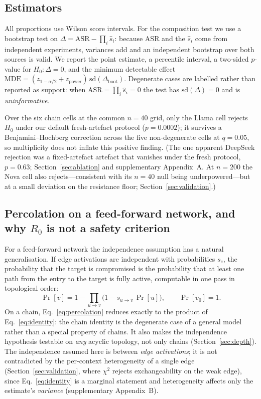 \documentclass[sigconf,anonymous]{aamas}
\begin{document}
\subsection{Estimators}

All proportions use Wilson score intervals. For the composition test we use a
bootstrap test on $\Delta = \mathrm{ASR} - \prod_i \hat s_i$: because ASR and the
$\hat s_i$ come from independent experiments, variances add and an independent
bootstrap over both sources is valid. We report the point estimate, a percentile
interval, a two-sided $p$-value for $H_0\!: \Delta = 0$, and the minimum
detectable effect $\mathrm{MDE} = (z_{1-\alpha/2} + z_{\mathrm{power}})\,
\mathrm{sd}(\Delta_{\mathrm{boot}})$. Degenerate cases are labelled rather than
reported as support: when $\mathrm{ASR} = \prod_i \hat s_i = 0$ the test has
$\mathrm{sd}(\Delta) = 0$ and is \emph{uninformative}.

Over the six chain cells at the common $n = 40$ grid, only the Llama cell rejects
$H_0$ under our default fresh-artefact protocol ($p = 0.0002$); it survives a
Benjamini--Hochberg correction across the five non-degenerate cells at $q = 0.05$, so
multiplicity does not inflate this positive finding. (The one apparent DeepSeek
rejection was a fixed-artefact artefact that vanishes under the fresh protocol,
$p = 0.63$; Section~\ref{sec:ablation} and supplementary Appendix~A. At $n = 200$ the
Nova cell also rejects---consistent with its $n = 40$ null being underpowered---but at
a small deviation on the resistance floor; Section~\ref{sec:validation}.)

\subsection{Percolation on a feed-forward network, and why $R_0$ is not a safety criterion}
\label{sec:threshold}

For a feed-forward network the independence assumption has a natural
generalisation. If edge activations are independent with probabilities $s_e$, the
probability that the target is compromised is the probability that at least one
path from the entry to the target is fully active, computable in one pass in
topological order:
\begin{equation}
\Pr[v] = 1 - \prod_{u \to v} \bigl(1 - s_{u\to v}\,\Pr[u]\bigr),
\qquad \Pr[v_0] = 1 .
\label{eq:percolation}
\end{equation}
On a chain, Eq.~\eqref{eq:percolation} reduces exactly to the product of
Eq.~\eqref{eq:identity}: the chain identity is the degenerate case of a general
model rather than a special property of chains. It also makes the independence
hypothesis testable on \emph{any} acyclic topology, not only chains
(Section~\ref{sec:depth}). The independence assumed here is between \emph{edge
activations}; it is not contradicted by the per-context heterogeneity of a single
edge (Section~\ref{sec:validation}, where $\chi^2$ rejects exchangeability on the
weak edge), since Eq.~\eqref{eq:identity} is a marginal statement and heterogeneity
affects only the estimate's \emph{variance} (supplementary Appendix~B).
\end{document}
